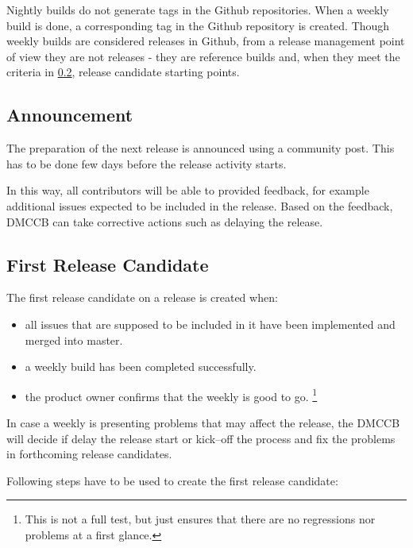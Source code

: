 Nightly builds do not generate tags in the Github repositories.
When a weekly build is done, a corresponding tag in the Github repository is created.
Though weekly builds are considered releases in Github, from a release management point of view they are not
releases - they are reference builds and, when they meet the criteria in \ref{sec:firstrc}, release candidate starting points.


\subsection{Announcement} \label{sec:anaouncement}

The preparation of the next release is announced using a community post.
This has to be done few days before the release activity starts.

In this way, all contributors will be able to provided feedback, for example additional issues expected to be included in the release.
Based on the feedback, DMCCB can take corrective actions such as delaying the release.


\subsection{First Release Candidate} \label{sec:firstrc}

The first release candidate on a release is created when:

\begin{itemize}
\item all issues that are supposed to be included in it have been implemented and merged into master.
\item a weekly build has been completed successfully.
\item the product owner confirms that the weekly is good to go. \footnote{This is not a full test, but just ensures that there are no regressions nor problems at a first glance.}
\end{itemize}

In case a weekly is presenting problems that may affect the release, the DMCCB will decide if delay the release start or kick--off the process and fix the problems in forthcoming release candidates.


Following steps have to be used to create the first release candidate:

